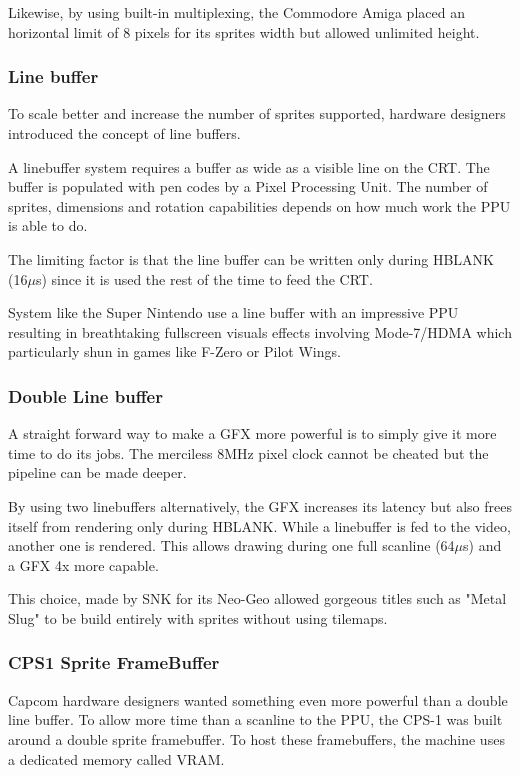 Likewise, by using built-in multiplexing, the Commodore Amiga placed an horizontal limit of 8 pixels for its sprites width but allowed unlimited height.

\subsubsection{Line buffer}
To scale better and increase the number of sprites supported, hardware designers introduced the concept of line buffers. 

A linebuffer system requires a buffer as wide as a visible line on the CRT. The buffer is populated with pen codes by a Pixel Processing Unit. The number of sprites, dimensions and rotation capabilities depends on how much work the PPU is able to do. 

The limiting factor is that the line buffer can be written only during HBLANK (16$\mu$s) since it is used the rest of the time to feed the CRT.

System like the Super Nintendo use a line buffer with an impressive PPU resulting in breathtaking fullscreen visuals effects involving Mode-7/HDMA which particularly shun in games like F-Zero or Pilot Wings.








\subsubsection{Double Line buffer}
A straight forward way to make a GFX more powerful is to simply give it more time to do its jobs. The merciless 8MHz pixel clock cannot be cheated but the pipeline can be made deeper.

By using two linebuffers alternatively, the GFX increases its latency but also frees itself from rendering only during HBLANK. While a linebuffer is fed to the video, another one is rendered. This allows drawing during one full scanline (64$\mu$s) and a GFX 4x more capable. 

This choice, made by SNK for its Neo-Geo allowed gorgeous titles such as "Metal Slug" to be build entirely with sprites without using tilemaps.




\subsubsection{CPS1 Sprite FrameBuffer}
Capcom hardware designers wanted something even more powerful than a double line buffer. To allow more time than a scanline to the PPU, the CPS-1 was built around a double sprite framebuffer. To host these framebuffers, the machine uses a dedicated memory called VRAM.

